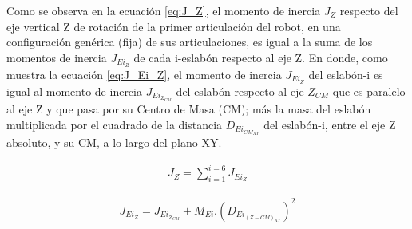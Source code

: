 \documentclass{article}
\begin{document}
\begin{sloppypar}

Como se observa en la ecuación \ref{eq:J_Z}, el momento de inercia $J_Z$ respecto del eje vertical Z de rotación de la primer articulación del robot, en una configuración genérica (fija) de sus articulaciones, es igual a la suma de los momentos de inercia $J_{Ei_Z}$ de cada i-eslabón respecto al eje Z. En donde, como muestra la ecuación \ref{eq:J_Ei_Z}, el momento de inercia $J_{Ei_Z}$ del eslabón-i es igual al momento de inercia $J_{Ei_{Z_{CM}}}$ del eslabón respecto al eje $Z_{CM}$ que es paralelo al eje Z y que pasa por su Centro de Masa (CM); más la masa del eslabón multiplicada por el cuadrado de la distancia $D_{Ei_{CM_{XY}}}$ del eslabón-i, entre el eje Z absoluto, y su CM, a lo largo del plano XY.

\begin{align} \label{eq:J_Z}
	J_Z=\sum_{i=1}^{i=6}J_{Ei_Z}
\end{align}

\begin{align} \label{eq:J_Ei_Z}
    J_{Ei_Z}=J_{Ei_{Z_{CM}}}+M_{Ei}.(D_{Ei_{(Z-CM)_{XY}}})^2
\end{align}


\end{sloppypar}
\end{document}
